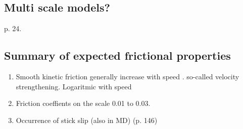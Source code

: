 \subsection{Multi scale models?}
\cite{Manini_2016} p. 24.

\subsection{Summary of expected frictional properties}




\begin{enumerate}
  \item Smooth kinetic friction generally increase with speed  \cite{Manini_2016}. so-called velocity strengthening.  Logaritmic with speed %
  \item Friction coeffients on the scale 0.01 to 0.03. 
  \item Occurrence of stick slip (also in MD) \cite{kim_nano-scale_2009} (p. 146)
\end{enumerate}




